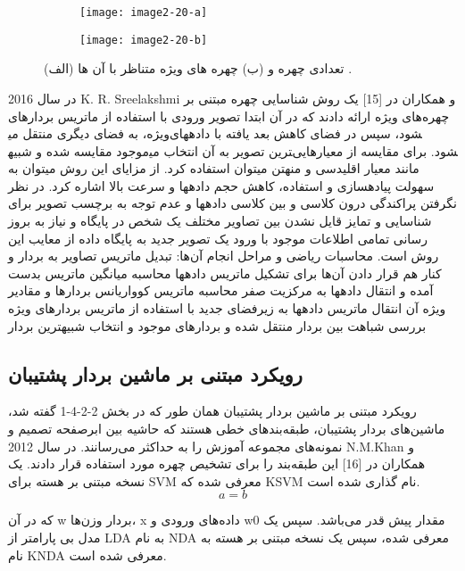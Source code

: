 \begin{figure}
\begin{subfigure}{.5\textwidth}
  \centering
  \texttt{[image: image2-20-a]}
  \label{image2-20-a}
\end{subfigure}
\begin{subfigure}{.5\textwidth}
  \centering
  \texttt{[image: image2-20-b]}
  \label{image2-20-b}
\end{subfigure}
  \caption{ (الف) تعدادی چهره و (ب) چهره های ویژه متناظر با آن ها \cite{ref1}.}
\label{fig:image2-20}
\end{figure}

در سال 2016 K. R. Sreelakshmi و همکاران در [15] یک روش شناسایی چهره مبتنی بر چهره‌های ویژه ارائه دادند که در آن ابتدا تصویر ورودی با استفاده از ماتریس بردارهای ویژه، به فضای دیگری منتقل می‎شود، سپس در فضای کاهش بعد یافته با داده‏های موجود مقایسه شده و شبیه‎ترین تصویر به آن انتخاب می‎شود. برای مقایسه از معیارهایی مانند معیار اقلیدسی و منهتن می‏توان استفاده کرد. از مزایای این روش می‏توان به سهولت پیاده‏سازی و استفاده، کاهش حجم داده‏ها و سرعت بالا اشاره کرد. در نظر نگرفتن پراکندگی درون کلاسی و بین کلاسی داده‏ها و عدم توجه به برچسب تصویر برای شناسایی و تمایز قایل نشدن بین تصاویر مختلف یک شخص در پایگاه و نیاز به بروز رسانی تمامی اطلاعات موجود با ورود یک تصویر جدید به پایگاه داده از معایب این روش است. 
محاسبات ریاضی و مراحل انجام آن‌ها:
	تبدیل ماتریس تصاویر به بردار و کنار هم قرار دادن آن‌ها برای تشکیل ماتریس داده‏ها
	محاسبه‏ میانگین ماتریس بدست آمده و انتقال داده‏ها به مرکزیت صفر
	محاسبه‏ ماتریس کوواریانس بردارها و مقادیر ویژه‏ آن
	انتقال ماتریس داده‏ها به زیرفضای جدید با استفاده از ماتریس بردارهای ویژه
	بررسی شباهت بین بردار منتقل شده و بردارهای موجود و انتخاب شبیه‏ترین بردار
	
\subsection{رویکرد مبتنی بر ماشین بردار پشتیبان}
	رویکرد مبتنی بر ماشین بردار پشتیبان
همان طور که در بخش 2-2-4-1 گفته شد، ماشین‌های بردار پشتیبان، طبقه‌بندهای خطی هستند که حاشیه بین ابرصفحه تصمیم و نمونه‌های مجموعه آموزش را به حداکثر می‌رسانند. در سال 2012 N.M.Khan و همکاران در [16] این طبقه‌بند را برای تشخیص چهره مورد استفاده قرار دادند. یک نسخه مبتنی بر هسته برای SVM معرفی شده که KSVM نام گذاری شده است.
\begin{equation}\label{eq2-7}
a = b
\end{equation}

	
که در آن w بردار وزن‌ها، x داده‌های ورودی و w0 مقدار پیش قدر  می‌باشد. سپس یک مدل بی پارامتر از LDA  به نام NDA  معرفی شده، سپس یک نسخه مبتنی بر هسته  به نام KNDA  معرفی شده است. 


